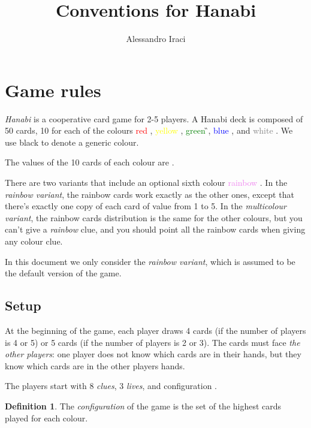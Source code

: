 \documentclass[a4paper]{article}
\title{Conventions for Hanabi}
\author{Alessandro Iraci}
\theoremstyle{plain}
\theoremstyle{definition}
\newtheorem{definition}[theorem]{Definition}
\begin{document}
	
\maketitle

\section{Game rules}

\textit{Hanabi} is a cooperative card game for 2-5 players. A Hanabi deck is composed of 50 cards, 10 for each of the colours \textcolor{red}{red} \R{\!}, \textcolor{yellow}{yellow} \Y{\!}, \textcolor{green}{green} \G{\!}, \textcolor{blue}{blue} \B{\!}, and \textcolor{gray}{white} \W{\!}. We use black to denote a generic colour.

The values of the 10 cards of each colour are          .

There are two variants that include an optional sixth colour \textcolor{violet}{rainbow} \M{\!}. In the \textit{rainbow variant}, the rainbow cards work exactly as the other ones, except that there's exactly one copy of each card of value from 1 to 5. In the \textit{multicolour variant}, the rainbow cards distribution is the same for the other colours, but you can't give a \textit{rainbow} clue, and you should point all the rainbow cards when giving any colour clue.

In this document we only consider the \textit{rainbow variant}, which is assumed to be the default version of the game.


\subsection{Setup}

At the beginning of the game, each player draws 4 cards (if the number of players is 4 or 5) or 5 cards (if the number of players is 2 or 3). The cards must face \textit{the other players}: one player does not know which cards are in their hands, but they know which cards are in the other players hands.

The players start with 8 \textit{clues}, 3 \textit{lives}, and configuration      .

\begin{definition}
	The \textit{configuration} of the game is the set of the highest cards played for each colour.
\end{definition}
\end{document}
